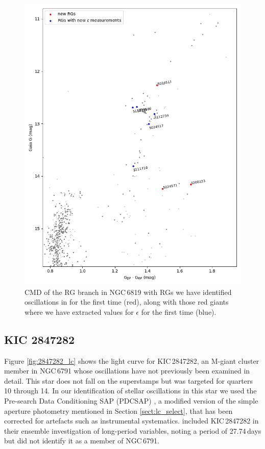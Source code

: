 \begin{figure}
    \centering
    \includegraphics[width=\linewidth]{Chapter5/6819_CMD_newRGS_interesting.png}
    \caption[CMD of new variables in the RG branch in NGC 6819]{CMD of the RG branch in NGC\,6819 with RGs we have identified oscillations in for the first time (red), along with those red giants where we have extracted values for $\epsilon$ for the first time (blue).}
    \label{fig:cmd_new_2}
\end{figure}

\subsection{KIC 2847282}

Figure \ref{fig:2847282_lc} shows the light curve for KIC\,2847282, an M-giant cluster member in NGC\,6791 whose oscillations have not previously been examined in detail. This star does not fall on the \Kepler{} superstamps but was targeted for quarters 10 through 14. In our identification of stellar oscillations in this star we used the \Kepler{} Pre-search Data Conditioning SAP (PDCSAP) \citep{smith_kepler_2012}, a modified version of the simple aperture photometry mentioned in Section \ref{sect:lc_select}, that has been corrected for artefacts such as instrumental systematics. \cite{yu_asteroseismology_2020} included KIC\,2847282 in their ensemble investigation of \Kepler{} long-period variables, noting a period of 27.74\,days but did not identify it as a member of NGC\,6791.

